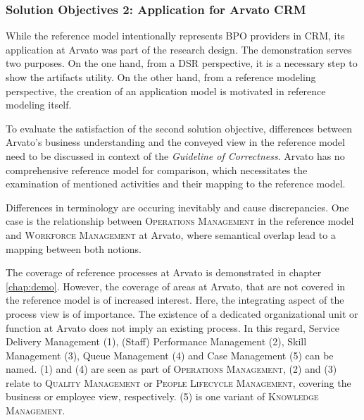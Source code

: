 \subsubsection{Solution Objectives 2: Application for Arvato CRM}

While the reference model intentionally represents BPO providers in CRM, its application at Arvato was part of the research design. The demonstration serves two purposes. On the one hand, from a \acrshort{DSR} perspective, it is a necessary step to show the artifacts utility. On the other hand, from a reference modeling perspective, the creation of an application model is motivated in reference modeling itself. 

To evaluate the satisfaction of the second solution objective, differences between Arvato's business understanding and the conveyed view in the reference model need to be discussed in context of the \textit{Guideline of Correctness}. Arvato has no comprehensive reference model for comparison, which necessitates the examination of mentioned activities and their mapping to the reference model. 

Differences in terminology are occuring inevitably and cause discrepancies. One case is the relationship between \textsc{Operations Management} in the reference model and \textsc{Workforce Management} at Arvato, where semantical overlap lead to a mapping between both notions. 

The coverage of reference processes at Arvato is demonstrated in chapter \ref{chap:demo}. However, the coverage of areas at Arvato, that are not covered in the reference model is of increased interest. Here, the integrating aspect of the  process view is of importance. The existence of a dedicated organizational unit or function at Arvato does not imply an existing process. In this regard, Service Delivery Management (1), (Staff) Performance Management (2), Skill Management (3), Queue Management (4) and Case Management (5) can be named. (1) and (4) are seen as part of \textsc{Operations Management}, (2) and (3) relate to \textsc{Quality Management} or \textsc{People Lifecycle Management}, covering the business or employee view, respectively. (5) is one variant of \textsc{Knowledge Management}. 


